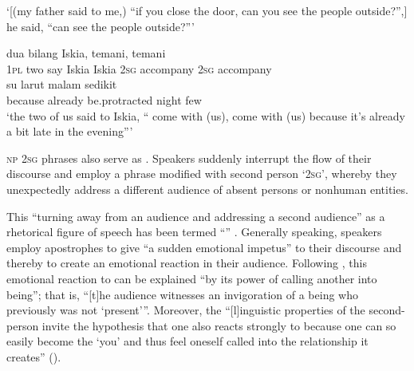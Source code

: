  ‘[(my father said to me,) ``if you close the door, can you see the people outside?'',] he said, ``can  see the people outside?''' \textstyleExampleSource{[081110-008-CvNP.0104]}
\z

\ea
\label{Example_6.58}
 {{dua}} {{bilang}} {Iskia,} {{}} {} {{temani,}} {} {temani}\\ %
 \textsc{1pl}  {two}  {say}  Iskia  {Iskia}  \textsc{2sg}  {accompany}  \textsc{2sg}  accompany\\
   {su}  {larut}  {malam}  {sedikit}\\
 {because}  {already}  {be.protracted}  {night}  {few}\\
\glt
‘the two of us said to Iskia, `` come with (us),  come with (us) because it’s already a bit late in the evening''' \textstyleExampleSource{[081025-006-Cv.0323/0325]}
\z




\textsc{np} \textsc{2sg}  phrases also serve as . Speakers suddenly interrupt the flow of their discourse and employ a  phrase modified with second person  ‘\textsc{2sg}’, whereby they unexpectedly address a different audience of absent persons or nonhuman entities.



This “turning away from an audience and addressing a second audience” as a rhetorical figure of speech has been termed “” \citep[75]{Bussmann.1996}. Generally speaking, speakers employ apostrophes to give “a sudden emotional impetus” \citep[313]{Abrams.2009} to their discourse and thereby to create an emotional reaction in their audience. Following \citet{Kacandes.1994}, this emotional reaction to  can be explained “by its power of calling another into being”; that is, “[t]he audience witnesses an invigoration of a being who previously was not ‘present’”. Moreover, the “[l]inguistic properties of the second-person  invite the hypothesis that one also reacts strongly to  because one can so easily become the ‘you’ and thus feel oneself called into the relationship it creates” (\citeyear*{Kacandes.1994}).



